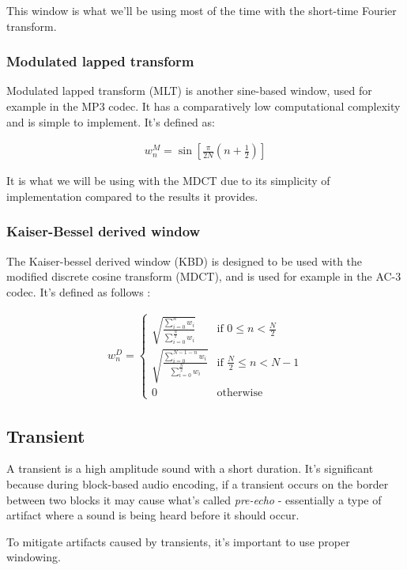 This window is what we'll be using most of the time with the short-time Fourier transform.

\subsubsection{Modulated lapped transform}
\label{sec:mlt}
Modulated lapped transform (MLT) is another sine-based window, used for example in the MP3 codec. It has a comparatively low computational complexity and is simple to implement. \cite{malvar_1990} It's defined as:

\begin{align}
\label{equ:mlt}
w_n^M = \sin \left[ \frac{\pi}{2N} \left( n + \frac12 \right) \right]
\end{align}

It is what we will be using with the MDCT due to its simplicity of implementation compared to the results it provides.

\subsubsection{Kaiser-Bessel derived window}
The Kaiser-bessel derived window (KBD) is designed to be used with the modified discrete cosine transform (MDCT), and is used for example in the AC-3 codec. It's defined as follows \cite{bosi_goldberg_2003}:

\begin{align}
w_n^D = \begin{cases}
\sqrt{\frac{\sum_{i=0}^{n}w_i}{\sum_{i=0}^{\frac{N}{2}}w_i}} & \text{if $0 \le n < \frac{N}{2}$} \\
\sqrt{\frac{\sum_{i=0}^{N-1-n}w_i}{\sum_{i=0}^{\frac{N}{2}}w_i}} & \text{if $\frac{N}{2} \le n < N - 1$} \\
0 & \text{otherwise}
\end{cases}
\end{align}

\subsection{Transient}
A transient is a high amplitude sound with a short duration. It's significant because during block-based audio encoding, if a transient occurs on the border between two blocks it may cause what's called \emph{pre-echo} - essentially a type of artifact where a sound is being heard before it should occur.

To mitigate artifacts caused by transients, it's important to use proper windowing.

